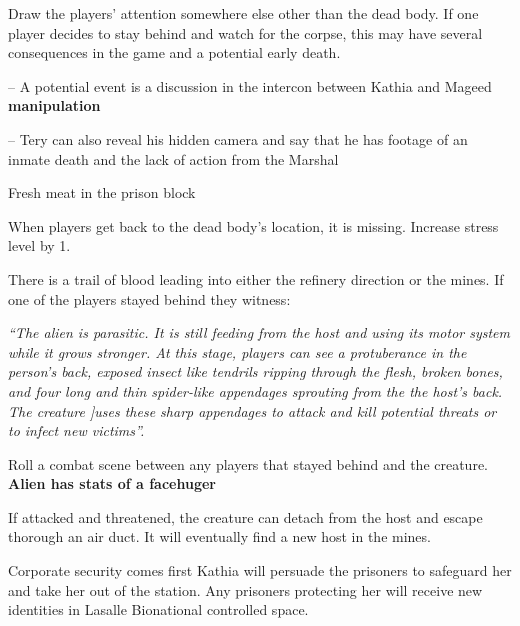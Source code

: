 \begin{rpg-commentbox}{}
    
    Draw the players' attention somewhere else other than the dead body. If one player decides to stay behind and watch for the corpse, this may have several consequences in the game and a potential early death.
    
    -- A potential event is a discussion in the intercon between Kathia and Mageed \textbf{manipulation}
    
    -- Tery can also reveal his hidden camera and say that he has footage of an inmate death and the lack of action from the Marshal

\end{rpg-commentbox}

\newsect



\begin{rpg-commentbox}{Fresh meat in the prison block}
    
    When players get back to the dead body's location, it is missing. Increase stress level by 1.
    
    There is a trail of blood leading into either the refinery direction or the mines. If one of the players stayed behind they witness:
    
    \textit{
    ``The alien is parasitic. It is still feeding from the host and using its motor system while it grows stronger. At this stage, players can see a protuberance in the person's back, exposed insect like tendrils ripping through the flesh, broken bones, and four long and thin spider-like appendages sprouting from the the host's back. The creature ]uses these sharp appendages to attack and kill potential threats or to infect new victims''.
    } 

    \medskip
    
    
    Roll a combat scene between any players that stayed behind and the creature. \textbf{Alien has stats of a facehuger}
    
    If attacked and threatened, the creature can detach from the host and escape thorough an air duct. It will eventually find a new host in the mines.
    
    

\end{rpg-commentbox}    


\begin{rpg-commentbox}{Corporate security comes first}
    Kathia will persuade the prisoners to safeguard her and take her out of the station. Any prisoners protecting her will receive new identities in Lasalle Bionational controlled space.
\end{rpg-commentbox}
    


